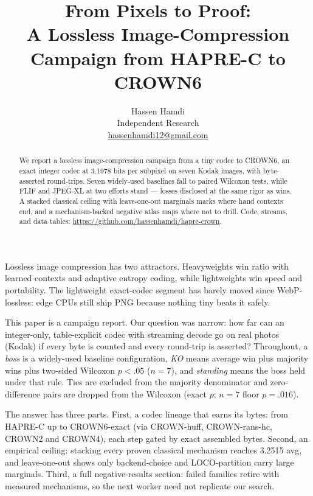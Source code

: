 \documentclass[smallabstract,smallcaptions]{dccpaper}
\begin{document}
\title
{\large
\textbf{From Pixels to Proof:\\ A Lossless Image-Compression Campaign from HAPRE-C to CROWN6}
}

\author{%
Hassen Hamdi\\[0.25em]
{\small Independent Research} \\ {\small \url{hassenhamdi12@gmail.com}}
}

\maketitle
\thispagestyle{empty}

\begin{abstract}
We report a lossless image-compression campaign from a tiny
codec to CROWN6, an exact integer codec at 3.1978 bits per
subpixel on seven Kodak images, with byte-asserted round-trips. Seven
widely-used baselines fall to paired Wilcoxon tests, while FLIF and JPEG-XL
at two efforts stand — losses disclosed at the same rigor as wins. A stacked classical ceiling with leave-one-out marginals
marks where hand contexts end, and a mechanism-backed negative atlas maps
where not to drill. Code, streams, and data tables:
\url{https://github.com/hassenhamdi/hapre-crown}.
\end{abstract}


Lossless image compression has two attractors. Heavyweights win ratio with
learned contexts and adaptive entropy coding, while lightweights win speed and
portability. The lightweight exact-codec segment has barely moved since
WebP-lossless: edge CPUs still ship PNG because nothing tiny beats it safely.

This paper is a campaign report. Our question was narrow: how far can an
integer-only, table-explicit codec with streaming decode go on real photos (Kodak) if
every byte is counted and every round-trip is asserted? Throughout, a
\emph{boss} is a widely-used baseline configuration, \emph{KO} means average
win plus majority wins plus two-sided Wilcoxon $p<.05$ ($n=7$), and
\emph{standing} means the boss held under that rule. Ties are excluded from
the majority denominator and zero-difference pairs are dropped from the
Wilcoxon (exact $p$; $n=7$ floor $p=.016$).

The answer has three parts. First, a codec lineage that earns its bytes:
from HAPRE-C up to CROWN6-exact (via CROWN-huff, CROWN-rans-hc,
CROWN2 and CROWN4), each step gated by exact assembled bytes.
Second, an empirical ceiling: stacking every proven
classical mechanism reaches 3.2515 avg, and leave-one-out shows only
backend-choice and LOCO-partition carry large marginals. Third, a full
negative-results section: failed families retire with measured mechanisms,
so the next worker need not replicate our search.
\end{document}
